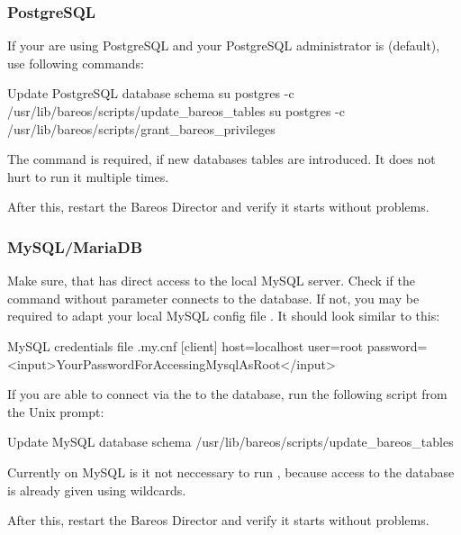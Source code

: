 
\subsubsection{PostgreSQL}
If your are using PostgreSQL and your PostgreSQL administrator is  (default), use following commands:

\begin{commands}{Update PostgreSQL database schema}
su postgres -c /usr/lib/bareos/scripts/update_bareos_tables
su postgres -c /usr/lib/bareos/scripts/grant_bareos_privileges
\end{commands}

The  command is required, if new databases tables are introduced. It does not hurt to run it multiple times.

After this, restart the Bareos Director and verify it starts without problems.

\subsubsection{MySQL/MariaDB}
Make sure, that  has direct access to the local MySQL server.
Check if the command  without parameter connects to the database.
If not, you may be required to adapt your local MySQL config file .
It should look similar to this:

\begin{config}{MySQL credentials file .my.cnf}
[client]
host=localhost
user=root
password=<input>YourPasswordForAccessingMysqlAsRoot</input>
\end{config}

If you are able to connect via the  to the database, run the following script from the Unix prompt:
\begin{commands}{Update MySQL database schema}
/usr/lib/bareos/scripts/update_bareos_tables
\end{commands}

Currently on MySQL is it not neccessary to run , because access to the database is already given using wildcards.

After this, restart the Bareos Director and verify it starts without problems.
